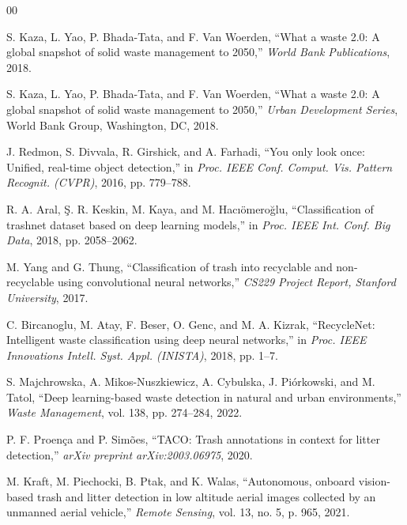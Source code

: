 \documentclass[conference]{IEEEtran}
\begin{document}
\begin{thebibliography}{00}

S. Kaza, L. Yao, P. Bhada-Tata, and F. Van Woerden, ``What a waste 2.0: A global snapshot of solid waste management to 2050,'' \textit{World Bank Publications}, 2018.

S. Kaza, L. Yao, P. Bhada-Tata, and F. Van Woerden, ``What a waste 2.0: A global snapshot of solid waste management to 2050,'' \textit{Urban Development Series}, World Bank Group, Washington, DC, 2018.

J. Redmon, S. Divvala, R. Girshick, and A. Farhadi, ``You only look once: Unified, real-time object detection,'' in \textit{Proc. IEEE Conf. Comput. Vis. Pattern Recognit. (CVPR)}, 2016, pp. 779--788.

R. A. Aral, \c{S}. R. Keskin, M. Kaya, and M. Hac{\i}\"{o}mero\u{g}lu, ``Classification of trashnet dataset based on deep learning models,'' in \textit{Proc. IEEE Int. Conf. Big Data}, 2018, pp. 2058--2062.

M. Yang and G. Thung, ``Classification of trash into recyclable and non-recyclable using convolutional neural networks,'' \textit{CS229 Project Report, Stanford University}, 2017.

C. Bircanoglu, M. Atay, F. Beser, O. Genc, and M. A. Kizrak, ``RecycleNet: Intelligent waste classification using deep neural networks,'' in \textit{Proc. IEEE Innovations Intell. Syst. Appl. (INISTA)}, 2018, pp. 1--7.

S. Majchrowska, A. Mikos-Nuszkiewicz, A. Cybulska, J. Pi\'{o}rkowski, and M. Tatol, ``Deep learning-based waste detection in natural and urban environments,'' \textit{Waste Management}, vol. 138, pp. 274--284, 2022.

P. F. Proen\c{c}a and P. Sim\~{o}es, ``TACO: Trash annotations in context for litter detection,'' \textit{arXiv preprint arXiv:2003.06975}, 2020.

M. Kraft, M. Piechocki, B. Ptak, and K. Walas, ``Autonomous, onboard vision-based trash and litter detection in low altitude aerial images collected by an unmanned aerial vehicle,'' \textit{Remote Sensing}, vol. 13, no. 5, p. 965, 2021.


\end{thebibliography}
\end{document}
